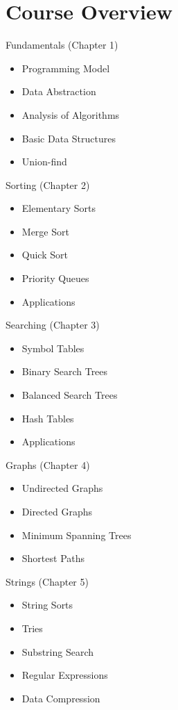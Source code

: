 \documentclass[8pt,a4paper,compress]{beamer}
\begin{document}
\section{Course Overview}

\begin{frame}[fragile]
\pause

Fundamentals (Chapter 1)
\begin{itemize}
\item Programming Model
\item Data Abstraction
\item Analysis of Algorithms
\item Basic Data Structures
\item Union-find
\end{itemize}

\pause
\bigskip

Sorting (Chapter 2)
\begin{itemize}
\item Elementary Sorts
\item Merge Sort
\item Quick Sort
\item Priority Queues
\item Applications
\end{itemize}
\end{frame}

\begin{frame}[fragile]
\pause

Searching (Chapter 3)
\begin{itemize}
\item Symbol Tables
\item Binary Search Trees
\item Balanced Search Trees
\item Hash Tables
\item Applications
\end{itemize}

\pause
\bigskip

Graphs (Chapter 4)
\begin{itemize}
\item Undirected Graphs
\item Directed Graphs
\item Minimum Spanning Trees
\item Shortest Paths
\end{itemize}

\pause
\bigskip

Strings (Chapter 5)
\begin{itemize}
\item String Sorts
\item Tries
\item Substring Search
\item Regular Expressions
\item Data Compression
\end{itemize}
\end{frame}
\end{document}
